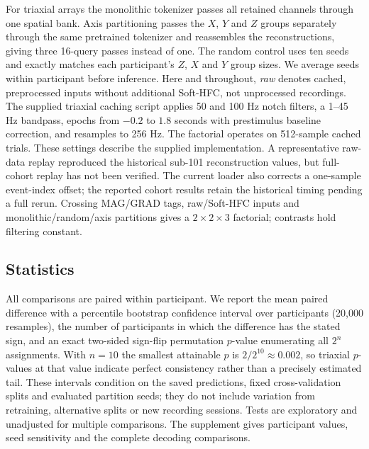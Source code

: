 For triaxial arrays the monolithic tokenizer passes all retained channels through one spatial bank. Axis partitioning passes the $X$, $Y$ and $Z$ groups separately through the same pretrained tokenizer and reassembles the reconstructions, giving three 16-query passes instead of one. The random control uses ten seeds and exactly matches each participant's $Z$, $X$ and $Y$ group sizes. We average seeds within participant before inference. Here and throughout, \emph{raw} denotes cached, preprocessed inputs without additional Soft-HFC, not unprocessed recordings. The supplied triaxial caching script applies 50 and 100 Hz notch filters, a 1--45 Hz bandpass, epochs from $-0.2$ to $1.8$ seconds with prestimulus baseline correction, and resamples to 256 Hz. The factorial operates on 512-sample cached trials. These settings describe the supplied implementation. A representative raw-data replay reproduced the historical sub-101 reconstruction values, but full-cohort replay has not been verified. The current loader also corrects a one-sample event-index offset; the reported cohort results retain the historical timing pending a full rerun. Crossing MAG/GRAD tags, raw/Soft-HFC inputs and monolithic/random/axis partitions gives a $2\times2\times3$ factorial; contrasts hold filtering constant.

\subsection{Statistics}
All comparisons are paired within participant. We report the mean paired difference with a percentile bootstrap confidence interval over participants (20{,}000 resamples), the number of participants in which the difference has the stated sign, and an exact two-sided sign-flip permutation $p$-value enumerating all $2^{n}$ assignments. With $n=10$ the smallest attainable $p$ is $2/2^{10} \approx 0.002$, so triaxial $p$-values at that value indicate perfect consistency rather than a precisely estimated tail. These intervals condition on the saved predictions, fixed cross-validation splits and evaluated partition seeds; they do not include variation from retraining, alternative splits or new recording sessions. Tests are exploratory and unadjusted for multiple comparisons. The supplement gives participant values, seed sensitivity and the complete decoding comparisons.


